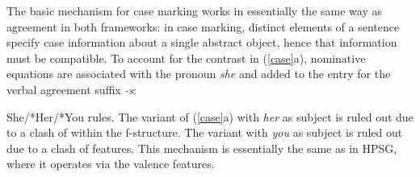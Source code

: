 The basic mechanism for case marking works in essentially the same way as agreement in both frameworks: in case marking, distinct elements of a sentence specify case information about a single abstract object, hence that information must be compatible.   To account for the contrast in (\ref{case}a), nominative  equations are associated with the pronoun \textit{she} and added to the entry for the verbal agreement suffix \textit{-s}:

\eal 
 \label{case}
\ex She/*Her/*You rules.
 \zl
The variant of (\ref{case}a) with \textit{her} as subject is ruled out due to a clash of   within the \subj{}  f-structure.  The variant with \textit{you} as subject is ruled out due to a clash of  features.  This mechanism is essentially the same as in HPSG, where it operates via the valence features.  

